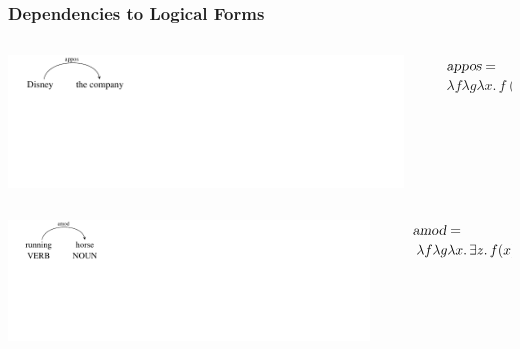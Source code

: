 \documentclass[mathserif,12pt]{beamer}
\renewcommand{\land}{\wedge}
\newcommand{\lspace}{.\,}
\begin{document}
\begin{frame}
\frametitle{Dependencies to Logical Forms}
 \vspace{0.6cm}
\begin{columns}
  \begin{column}{0.40\textwidth}
   \centering
  \vspace{-1em}
\includegraphics[trim=1.5em 9em 28em 0em,clip=true,scale=1.3]{figures/appos}   
  \end{column}
    \begin{column}{0.1\textwidth}
  \end{column}
  \begin{column}{0.58\textwidth}
    \large $\textsl{appos}  =$ \\ \hspace{0.5em} $ \lambda f \lambda g \lambda x \lspace f(x) \land g(x)$ \\
  \end{column}
 \end{columns}
 
 \pause
 \vspace{0.6cm}
 \begin{columns}
  \begin{column}{0.39\textwidth}
   \centering
\includegraphics[trim=1.5em 10em 26em 0em,clip=true,scale=1.2]{figures/amod-verb}
  \end{column}
  \begin{column}{0.1\textwidth}
  \end{column}
  \begin{column}{0.59\textwidth}
\large    $\textsl{amod}= $ \\ \hspace{0.5em} $\lambda f \lambda g \lambda x \lspace \exists z \lspace f(x) \land g(z) \land \hbox{amod}^i(z_e, x_a)$ 
  \end{column}
  

\end{columns}
\end{frame}
\end{document}

